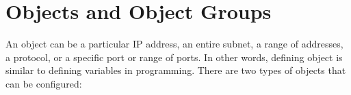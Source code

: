%
%
%
%
%
%
%
%
%
%
%

\section{Objects and Object Groups}

An object can be a particular IP address, an entire subnet, a range of addresses, a protocol, or a specific port or range of ports. In other words, defining object is similar to defining variables in programming. There are two types of objects that can be configured:

